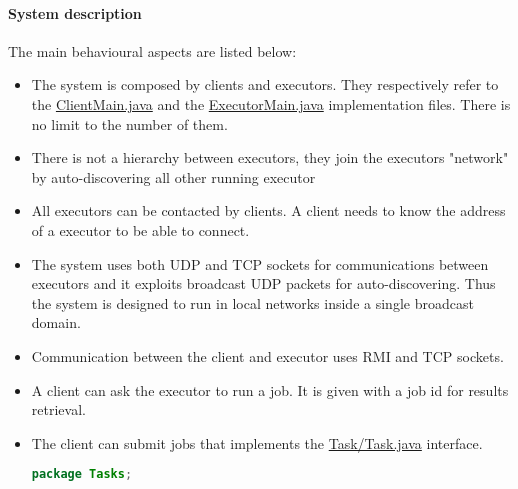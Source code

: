 \documentclass{article}
\begin{document}
\paragraph{System description}
The main behavioural aspects are listed below:
\begin{itemize}
	
	\item The system is composed by clients and executors. They respectively refer to the \href{https://github.com/Alenichel/MartinaNichelini-DistributedJobScheduling/blob/master/src/main/java/Main/ClientMain.java}{ClientMain.java} and the \href{https://github.com/Alenichel/MartinaNichelini-DistributedJobScheduling/blob/master/src/main/java/Main/ExecutorMain.java}{ExecutorMain.java} implementation files. There is no limit to the number of them.
	\item There is not a hierarchy between executors, they join the executors "network" by auto-discovering all other running executor
	\item All executors can be contacted by clients. A client needs to know the address of a executor to be able to connect.
	\item The system uses both UDP and TCP sockets for communications between executors and it exploits broadcast UDP packets for auto-discovering. Thus the system is designed to run in local networks inside a single broadcast domain.
	\item Communication between the client and executor uses RMI and TCP sockets.
	\item A client can ask the executor to run a job. It is given with a job id for results retrieval.	
	\item The client can submit jobs that implements the \href{https://github.com/Alenichel/MartinaNichelini-DistributedJobScheduling/blob/master/src/main/java/Tasks/Task.java}{Task/Task.java} interface.

\begin{file}
\begin{lstlisting}[language=Java]
package Tasks;


\end{lstlisting}
\end{file}
\end{itemize}
\end{document}
